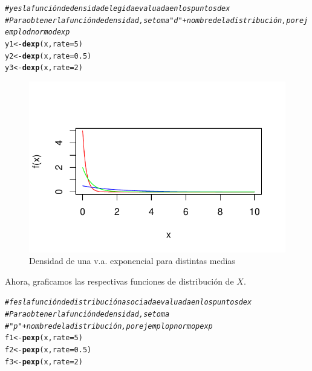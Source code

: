 \documentclass[10pt]{article}\usepackage[]{graphicx}\usepackage[]{xcolor}
\makeatletter
\def\maxwidth{ %
  \ifdim\Gin@nat@width>\linewidth
    \linewidth
  \else
    \Gin@nat@width
  \fi
}
\newcommand{\hlnum}[1]{\textcolor[rgb]{0.686,0.059,0.569}{#1}}%
\newcommand{\hlcom}[1]{\textcolor[rgb]{0.678,0.584,0.686}{\textit{#1}}}%
\newcommand{\hlstd}[1]{\textcolor[rgb]{0.345,0.345,0.345}{#1}}%
\newcommand{\hlkwb}[1]{\textcolor[rgb]{0.69,0.353,0.396}{#1}}%
\newcommand{\hlkwc}[1]{\textcolor[rgb]{0.333,0.667,0.333}{#1}}%
\newcommand{\hlkwd}[1]{\textcolor[rgb]{0.737,0.353,0.396}{\textbf{#1}}}%
\newenvironment{kframe}{%
 \def\at@end@of@kframe{}%
 \ifinner\ifhmode%
  \def\at@end@of@kframe{\end{minipage}}%
  \begin{minipage}{\columnwidth}%
 \fi\fi%
 \def\FrameCommand##1{\hskip\@totalleftmargin \hskip-\fboxsep
 \colorbox{shadecolor}{##1}\hskip-\fboxsep
     \hskip-\linewidth \hskip-\@totalleftmargin \hskip\columnwidth}%
 \MakeFramed {\advance\hsize-\width
   \@totalleftmargin\z@ \linewidth\hsize
   \@setminipage}}%
 {\par\unskip\endMakeFramed%
 \at@end@of@kframe}
\newenvironment{knitrout}{}{} %
\makeatother
\begin{document}
\begin{knitrout}
\color{fgcolor}\begin{kframe}
\begin{alltt}
\hlcom{# y es la función de densidad elegida evaluada en los puntos de x}
\hlcom{# Para obtener la función de densidad, se toma "d"+nombre de la distribución, por ejemplo dnorm o dexp}
\hlstd{y1} \hlkwb{<-} \hlkwd{dexp}\hlstd{(x,} \hlkwc{rate} \hlstd{=} \hlnum{5}\hlstd{)}
\hlstd{y2} \hlkwb{<-} \hlkwd{dexp}\hlstd{(x,} \hlkwc{rate} \hlstd{=} \hlnum{0.5}\hlstd{)}
\hlstd{y3} \hlkwb{<-} \hlkwd{dexp}\hlstd{(x,} \hlkwc{rate} \hlstd{=} \hlnum{2}\hlstd{)}
\end{alltt}
\end{kframe}
\end{knitrout}
\begin{knitrout}
\color{fgcolor}\begin{figure}[htbp]

{\centering \includegraphics[width=\maxwidth]{figure/densidades-1} 

}

\caption[Densidad de una v.a]{Densidad de una v.a. exponencial para distintas medias}\label{fig:densidades}
\end{figure}

\end{knitrout}
Ahora, graficamos las respectivas funciones de distribución de $X$.

\begin{knitrout}
\color{fgcolor}\begin{kframe}
\begin{alltt}
\hlcom{# f es la función de distribución asociada evaluada en los puntos de x}
\hlcom{# Para obtener la función de densidad, se toma}
\hlcom{# "p"+nombre de la distribución, por ejemplo pnorm o pexp}
\hlstd{f1} \hlkwb{<-} \hlkwd{pexp}\hlstd{(x,} \hlkwc{rate} \hlstd{=} \hlnum{5} \hlstd{)}
\hlstd{f2} \hlkwb{<-} \hlkwd{pexp}\hlstd{(x,} \hlkwc{rate} \hlstd{=} \hlnum{0.5} \hlstd{)}
\hlstd{f3} \hlkwb{<-} \hlkwd{pexp}\hlstd{(x,} \hlkwc{rate} \hlstd{=} \hlnum{2} \hlstd{)}
\end{alltt}
\end{kframe}
\end{knitrout}
\end{document}
